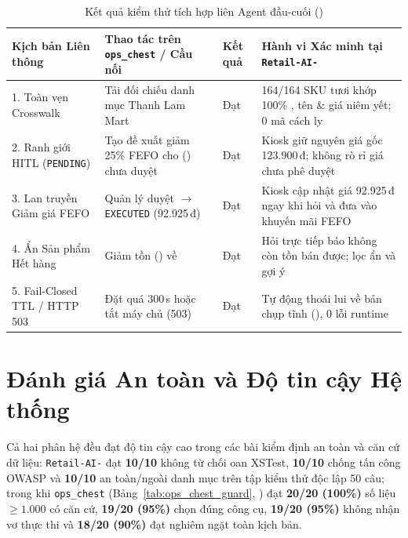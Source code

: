 \begin{table}[H]
\centering
\caption{Kết quả kiểm thử tích hợp liên Agent đầu-cuối ()}
\label{tab:bridge_e2e_results}
\footnotesize
\begin{tabularx}{\textwidth}{L{3.5cm} L{4.2cm} L{1.5cm} Y}
\toprule
\textbf{Kịch bản Liên thông} & \textbf{Thao tác trên \texttt{ops\_chest} / Cầu nối} & \textbf{Kết quả} & \textbf{Hành vi Xác minh tại \texttt{Retail-AI-}} \\
. Toàn vẹn Crosswalk & Tải  đối chiếu danh mục Thanh Lam Mart & Đạt & 164/164 SKU tươi khớp 100\% , tên \& giá niêm yết; 0 mã cách ly \\
2. Ranh giới HITL (\texttt{PENDING}) & Tạo đề xuất giảm 25\% FEFO cho  () chưa duyệt & Đạt & Kiosk giữ nguyên giá gốc 123.900\,đ; không rò rỉ giá chưa phê duyệt \\
3. Lan truyền Giảm giá FEFO & Quản lý duyệt  $\to$ \texttt{EXECUTED} (92.925\,đ) & Đạt & Kiosk cập nhật giá 92.925\,đ ngay khi hỏi và đưa vào khuyến mãi FEFO \\
4. Ẩn Sản phẩm Hết hàng & Giảm tồn  () về  & Đạt & Hỏi trực tiếp báo không còn tồn bán được; lọc  ẩn  và gợi ý  \\
5. Fail-Closed TTL / HTTP 503 & Đặt  quá 300\,s hoặc tắt máy chủ (503) & Đạt & Tự động thoái lui về bản chụp tĩnh (), 0 lỗi runtime \\
\bottomrule
\end{tabularx}
\end{table}

\section{Đánh giá An toàn và Độ tin cậy Hệ thống}

Cả hai phân hệ đều đạt độ tin cậy cao trong các bài kiểm định an toàn và căn cứ dữ liệu: \texttt{Retail-AI-} đạt \textbf{10/10} không từ chối oan XSTest, \textbf{10/10} chống tấn công OWASP và \textbf{10/10} an toàn/ngoài danh mục trên tập kiểm thử độc lập 50 câu; trong khi \texttt{ops\_chest} (Bảng~\ref{tab:ops_chest_guard}, ) đạt \textbf{20/20 (100\%)} số liệu $\ge 1.000$ có căn cứ, \textbf{19/20 (95\%)} chọn đúng công cụ, \textbf{19/20 (95\%)} không nhận vơ thực thi và \textbf{18/20 (90\%)} đạt nghiêm ngặt toàn kịch bản.


